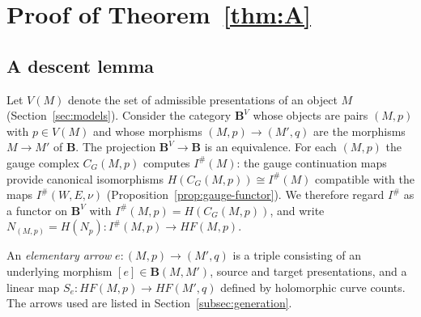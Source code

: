 \documentclass[11pt]{amsart}
\theoremstyle{definition}
\theoremstyle{remark}
\theoremstyle{plain}
\numberwithin{equation}{section}
\newcommand{\bB}{\mathbf{B}}
\newcommand{\Ish}{I^{\#}}
\newcommand{\HF}{\mathit{HF}}
\begin{document}
\section{Proof of Theorem~\ref{thm:A}}\label{sec:assembly}

\subsection{A descent lemma}

Let $V(M)$ denote the set of admissible presentations of an object $M$
(Section~\ref{sec:models}). Consider the category $\bB^V$ whose objects
are pairs $(M,p)$ with $p\in V(M)$ and whose morphisms
$(M,p)\to(M',q)$ are the morphisms $M\to M'$ of $\bB$. The projection
$\bB^V\to\bB$ is an equivalence. For each $(M,p)$ the gauge complex
$C_G(M,p)$ computes $\Ish(M)$: the gauge continuation maps provide
canonical isomorphisms $H(C_G(M,p))\cong\Ish(M)$ compatible with the
maps $\Ish(W,E,\nu)$ (Proposition~\ref{prop:gauge-functor}). We
therefore regard $\Ish$ as a functor on $\bB^V$ with
$\Ish(M,p)=H(C_G(M,p))$, and write $N_{(M,p)}=H(N_p)\colon
\Ish(M,p)\to\HF(M,p)$.

An \emph{elementary arrow} $e\colon(M,p)\to(M',q)$ is a triple consisting
of an underlying morphism $[e]\in\bB(M,M')$, source and target
presentations, and a linear map $S_e\colon\HF(M,p)\to\HF(M',q)$ defined
by holomorphic curve counts. The arrows used are listed in
Section~\ref{subsec:generation}.
\end{document}

